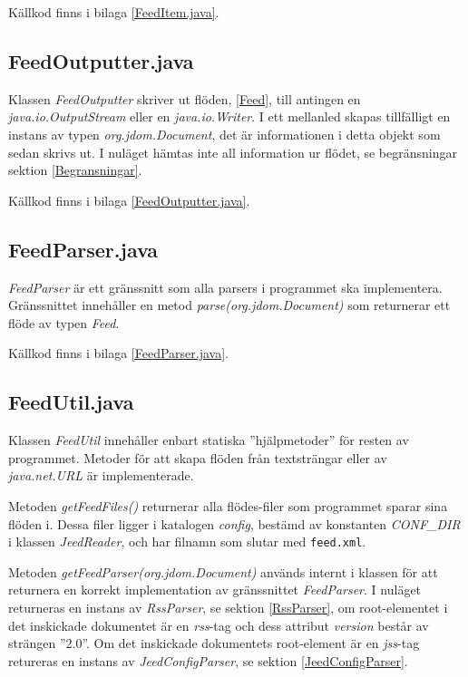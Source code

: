 \documentclass[a4paper, 12pt]{article}
\begin{document}
Källkod finns i bilaga \ref{FeedItem.java}.

\subsection{FeedOutputter.java}\label{FeedOutputter}
Klassen \textit{FeedOutputter} skriver ut flöden, \ref{Feed}, till
antingen en \textit{java.io.OutputStream} eller en
\textit{java.io.Writer}. I ett mellanled skapas tillfälligt en instans
av typen \textit{org.jdom.Document}, det är informationen i detta
objekt som sedan skrivs ut. I nuläget hämtas inte all information ur
flödet, se begränsningar sektion \ref{Begransningar}.

Källkod finns i bilaga \ref{FeedOutputter.java}.

\subsection{FeedParser.java}\label{FeedParser}
\textit{FeedParser} är ett gränssnitt som alla parsers i programmet
ska implementera. Gränssnittet innehåller en metod
\textit{parse(org.jdom.Document)} som returnerar ett flöde av typen
\textit{Feed}.

Källkod finns i bilaga \ref{FeedParser.java}.

\subsection{FeedUtil.java}\label{FeedUtil}
Klassen \textit{FeedUtil} innehåller enbart statiska
''hjälp\-metoder'' för resten av programmet. Metoder för att skapa
flöden från textsträngar eller av \textit{java.net.URL} är
implementerade.

Metoden \textit{getFeedFiles()}\label{getFeedFiles()} returnerar alla
flödes-filer som programmet sparar sina flöden i. Dessa filer ligger i
katalogen \textit{config}, bestämd av konstanten \textit{CONF\_DIR} i
klassen \textit{JeedReader}, och har filnamn som slutar med
\verb!feed.xml!.

Metoden \textit{getFeedParser(org.jdom.Document)} används internt i
klassen för att returnera en korrekt implementation av gränssnittet
\textit{FeedParser}. I nuläget returneras en instans av
\textit{RssParser}, se sektion \ref{RssParser}, om root-elementet i
det inskickade dokumentet är en \textit{rss}-tag och dess attribut
\textit{version} består av strängen ''2.0''. Om det inskickade
dokumentets root-element är en \textit{jss}-tag retureras en instans
av \textit{JeedConfigParser}, se sektion \ref{JeedConfigParser}.
\end{document}
